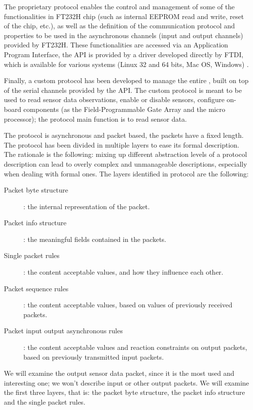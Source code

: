 \documentclass{article} \usepackage{times}
\begin{document}
The proprietary protocol enables the control and management of some of
the functionalities in FT232H chip (such as internal EEPROM read and
write, reset of the chip, etc.), as well as the definition of the
communication protocol and properties to be used in the asynchronous
channels (input and output channels) provided by FT232H.  These
functionalities are accessed via an Application Program Interface, the
API is provided by a driver developed directly by FTDI, which is
available for various systems (Linux 32 and 64 bits, Mac OS, Windows)
\cite{ftdi_d2xx_api_2009}.

Finally, a custom protocol has been developed to manage the entire
\STSB, built on top of the serial channels provided by the API.  The
custom protocol is meant to be used to read sensor data observations,
enable or disable sensors, configure on-board components (as the
Field-Programmable Gate Array and the micro processor); the protocol
main function is to read sensor data.

The protocol is asynchronous and packet based, the packets have a
fixed length.  The protocol has been divided in multiple layers to
ease its formal description.  The rationale is the following: mixing
up different abstraction levels of a protocol description can lead to
overly complex and unmanageable descriptions, especially when dealing
with formal ones.  The layers identified in protocol are the
following:

\begin{description}
\item[Packet byte structure]: the internal representation of the
  packet.
\item[Packet info structure]: the meaningful fields contained in the
  packets.
\item[Single packet rules]: the content acceptable values, and how
  they influence each other.
\item[Packet sequence rules]: the content acceptable values, based on
  values of previously received packets.
\item[Packet input output asynchronous rules]: the content acceptable
  values and reaction constraints on output packets, based on
  previously transmitted input packets.
\end{description}

We will examine the output sensor data packet, since it is the most
used and interesting one; we won't describe input or other output
packets.  We will examine the first three layers, that is: the packet
byte structure, the packet info structure and the single packet rules.
\end{document}
